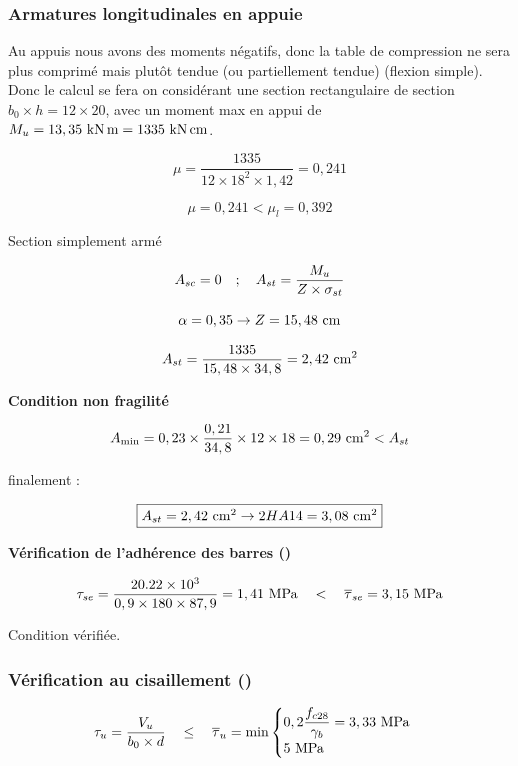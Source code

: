 \subsubsection{Armatures longitudinales en appuie}


Au appuis nous avons des moments négatifs, donc la table de compression ne sera plus comprimé mais plutôt tendue (ou partiellement tendue) (flexion simple). Donc le calcul se fera on considérant une section rectangulaire de section $b_{0} \times h = 12 \times 20 $, avec un moment max en appui de $M_{u} = 13,35\knxm = 1335\knxcm$.

\vspace{\baselineskip}

\[ \mu = \dfrac{1335}{12 \times 18^{2} \times 1,42} = 0,241 \]

\[ \mu = 0,241 < \mu_{l} = 0,392 \]
{\centering Section simplement armé \par}

\[ A_{sc} = 0 \quad;\quad A_{st} = \dfrac{M_{u}}{Z \times \sigma_{st}} \]

\[ \alpha = 0,35 \rightarrow Z = 15,48\cml \]

\[ A_{st} = \dfrac{1335}{15,48 \times 34,8} = 2,42\cmsq \]

\vspace{\baselineskip}

\textbf{Condition non fragilité}

\[ A_{\min} = 0,23 \times \dfrac{0,21}{34,8} \times 12 \times 18 = 0,29\cmsq < A_{st} \]

\vspace{\baselineskip}

finalement :

\[ \fbox{$A_{st} = 2,42\cmsq \rightarrow 2HA14 = 3,08\cmsq$} \]

\vspace{2\baselineskip}

\textbf{Vérification de l'adhérence des barres (\cite[A.6.1.3]{BAEL})}

\[ \tau_{se} = \dfrac{\num{20,22e3}}{0,9 \times 180 \times 87,9} = 1,41\mpa \quad<\quad \taubar{se} = 3,15\mpa \]
{\centering Condition vérifiée.\par}


\subsubsection{Vérification au cisaillement (\cite[A.5.1.1]{BAEL})}


\[ \tau_{u} = \dfrac{V_{u}}{b_{0} \times d} \quad\leq\quad \taubar{u} = \min\begin{cases}
	0,2\dfrac{f_{c28}}{\gamma_{b}} = 3,33\mpa \\
	5\mpa
\end{cases} \]

